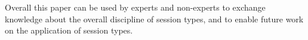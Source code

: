 Overall this paper can be used by experts and non-experts
to exchange knowledge about the overall discipline of session types,
and to enable future work on the application of session types.


\begin{comment}
\subsection{Overview of the paper}

The paper begins in \secref{preliminaries}
with the definition of the basic terms and notions
that are used throughout the paper for the exhibition of the usecase
results.

The usecases that are presented in the paper are compiled by the researchers
working on the ABCD project and can be found in the ABCD online repository~\cite{usecase_repository}.
In \secref{usecases} there is a summary presentation
of the usecases in the online repository that gives an overview
for each usecase and discusses its design and implementation specifics
as well as the features that are being demonstrated.

In \secref{presentation} there is the selection of two
usecases from the online repository in order to demonstrate
some of the basic notions of the application of session types.
The first example is an example of an online book-store,
where two buyers want to share the expenses to buy a book.
The online book-store is consider in the bibliography as the
standard example for the presentation session types.
It first demonstrates the basic send receive operations
between multiple entities in a concurrent protocol. A second
feature is the fact that it demonstrate in a comprehensive
way the interaction logic between the entities.
The implementation of the book-store usecase using different
technologies gives a further insight to the applicability of
session types.
The second usecase presented in full is the design and implementation
of the Simple Mail Transfer Protocol~\cite{citation_needed} (SMTP),
as a way to demonstrate how session types cope with real network
protocols. SMTP is a protocol based on states. The increased complexity
of states makes the design and implementation of the SMTP a demanding
procedure. The paper claims that the use of session types can reduce
the demands of the implementation of SMTP.

\secref{engineering} makes a summary of the software engineering
practices that are identified... \dk{put more}
\end{comment}


